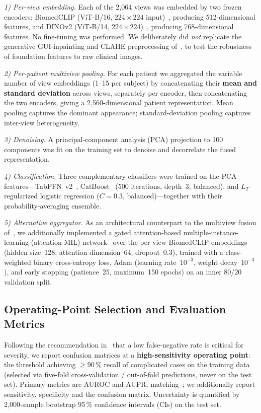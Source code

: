 \documentclass[journal]{IEEEtran}
\begin{document}
\emph{1) Per-view embedding.} Each of the 2{,}064 views was embedded by two frozen
encoders: BiomedCLIP (ViT-B/16, $224\times224$ input)~\cite{zhang2025biomedclip},
producing 512-dimensional features, and DINOv2 (ViT-B/14,
$224\times224$)~\cite{oquab2024dinov2}, producing 768-dimensional features. No
fine-tuning was performed. We deliberately did \emph{not} replicate the generative
GUI-inpainting and CLAHE preprocessing of~\cite{marcinkevics2024interpretable}, to test
the robustness of foundation features to raw clinical images.

\emph{2) Per-patient multiview pooling.} For each patient we aggregated the variable
number of view embeddings (1--15 per subject) by concatenating their \textbf{mean and
standard deviation} across views, separately per encoder, then concatenating the two
encoders, giving a 2{,}560-dimensional patient representation. Mean pooling captures the
dominant appearance; standard-deviation pooling captures inter-view heterogeneity.

\emph{3) Denoising.} A principal-component analysis (PCA) projection to 100 components
was fit on the training set to denoise and decorrelate the fused representation.

\emph{4) Classification.} Three complementary classifiers were trained on the PCA
features---TabPFN~v2~\cite{hollmann2025accurate}, CatBoost~\cite{prokhorenkova2018catboost}
(500 iterations, depth~3, balanced), and $L_2$-regularized logistic regression
($C=0.3$, balanced)---together with their probability-averaging ensemble.

\emph{5) Alternative aggregator.} As an architectural counterpart to the multiview
fusion of~\cite{marcinkevics2024interpretable}, we additionally implemented a gated
attention-based multiple-instance-learning (attention-MIL)
network~\cite{ilse2018attention} over the per-view BiomedCLIP embeddings (hidden
size~128, attention dimension~64, dropout~0.3), trained with a class-weighted binary
cross-entropy loss, Adam (learning rate~$10^{-3}$, weight decay~$10^{-3}$), and early
stopping (patience~25, maximum~150 epochs) on an inner 80/20 validation split.

\subsection{Operating-Point Selection and Evaluation Metrics}
Following the recommendation in~\cite{marcinkevics2024interpretable} that a low
false-negative rate is critical for severity, we report confusion matrices at a
\textbf{high-sensitivity operating point}: the threshold achieving $\geq$90\,\% recall
of complicated cases on the training data (selected via five-fold cross-validation /
out-of-fold predictions, never on the test set). Primary metrics are AUROC and AUPR,
matching~\cite{marcinkevics2024interpretable}; we additionally report sensitivity,
specificity and the confusion matrix. Uncertainty is quantified by 2{,}000-sample
bootstrap 95\,\% confidence intervals (CIs) on the test set.
\end{document}
